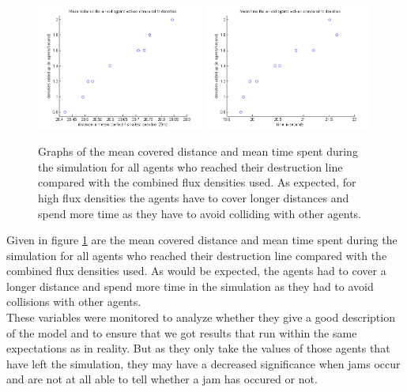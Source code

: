\begin{figure}[h!]
	\centering
		\includegraphics[width=0.49\textwidth]{pictures/AMeanDistancesCompared.png}
		\includegraphics[width=0.49\textwidth]{pictures/AMeanTimeCompared.png}
	\caption{Graphs of the mean covered distance and mean time spent during the simulation for all agents who reached their destruction line compared with the combined flux densities used. As expected, for high flux densities the agents have to cover longer distances and spend more time as they have to avoid colliding with other agents.}
	\label{fig:ACompared}
\end{figure}

\noi Given in figure \ref{fig:ACompared} are the mean covered distance and mean time spent during the simulation for all agents who reached their destruction line compared with the combined flux densities used. As would be expected, the agents had to cover a longer distance and spend more time in the simulation as they had to avoid collisions with other agents.\\
These variables were monitored to analyze whether they give a good description of the model and to ensure that we got results that run within the same expectations as in reality. But as they only take the values of those agents that have left the simulation, they may have a decreased significance when jams occur and are not at all able to tell whether a jam has occured or not.


